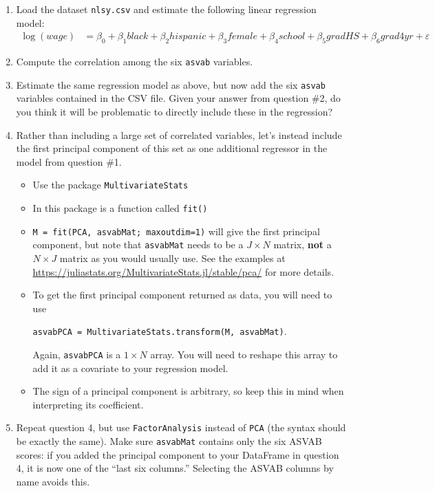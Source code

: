 \documentclass[12pt,english]{article}
\begin{document}
\begin{enumerate}
\item Load the dataset \texttt{nlsy.csv} and estimate the following linear regression model:
\begin{align*}
    \log(wage) &= \beta_0 + \beta_1 black + \beta_2 hispanic + \beta_3 female + \beta_4 school + \beta_5 gradHS + \beta_6 grad4yr + \varepsilon
\end{align*}

\item Compute the correlation among the six \texttt{asvab} variables.

\item Estimate the same regression model as above, but now add the six \texttt{asvab} variables contained in the CSV file. Given your answer from question \#2, do you think it will be problematic to directly include these in the regression?

\item Rather than including a large set of correlated variables, let's instead include the first principal component of this set as one additional regressor in the model from question \#1.
\begin{itemize}
    \item Use the package \texttt{MultivariateStats}
    \item In this package is a function called \texttt{fit()}
    \item \texttt{M = fit(PCA, asvabMat; maxoutdim=1)} will give the first principal component, but note that \texttt{asvabMat} needs to be a $J\times N$ matrix, \textbf{not} a $N\times J$ matrix as you would usually use. See the examples at \url{https://juliastats.org/MultivariateStats.jl/stable/pca/} for more details.
    \item To get the first principal component returned as data, you will need to use
    
    \texttt{asvabPCA = MultivariateStats.transform(M, asvabMat)}.
    
    Again, \texttt{asvabPCA} is a $1 \times N$ array. You will need to reshape this array to add it as a covariate to your regression model.
    \item The sign of a principal component is arbitrary, so keep this in mind when interpreting its coefficient.
\end{itemize}

\item Repeat question 4, but use \texttt{FactorAnalysis} instead of \texttt{PCA} (the syntax should be exactly the same). Make sure \texttt{asvabMat} contains only the six ASVAB scores: if you added the principal component to your DataFrame in question 4, it is now one of the ``last six columns.'' Selecting the ASVAB columns by name avoids this.


\end{enumerate}
\end{document}

